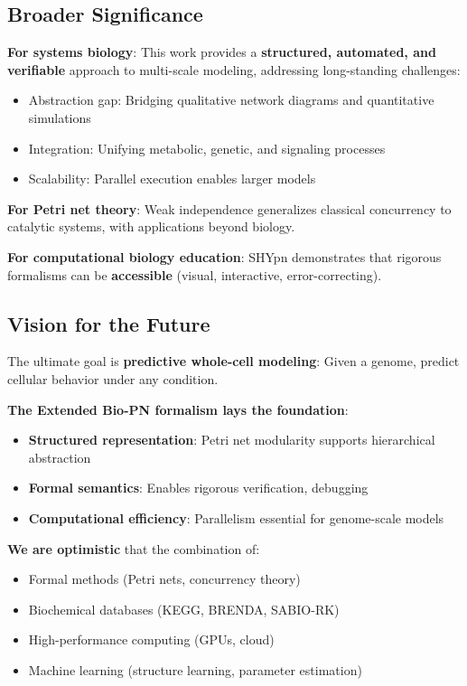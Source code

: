 \subsection{Broader Significance}
\label{subsec:broader-significance}

\textbf{For systems biology}: This work provides a \textbf{structured, automated, and verifiable} approach to multi-scale modeling, addressing long-standing challenges:
\begin{itemize}
    \item Abstraction gap: Bridging qualitative network diagrams and quantitative simulations
    \item Integration: Unifying metabolic, genetic, and signaling processes
    \item Scalability: Parallel execution enables larger models
\end{itemize}

\textbf{For Petri net theory}: Weak independence generalizes classical concurrency to catalytic systems, with applications beyond biology.

\textbf{For computational biology education}: SHYpn demonstrates that rigorous formalisms can be \textbf{accessible} (visual, interactive, error-correcting).

\subsection{Vision for the Future}
\label{subsec:vision}

The ultimate goal is \textbf{predictive whole-cell modeling}: Given a genome, predict cellular behavior under any condition.

\textbf{The Extended Bio-PN formalism lays the foundation}:
\begin{itemize}
    \item \textbf{Structured representation}: Petri net modularity supports hierarchical abstraction
    \item \textbf{Formal semantics}: Enables rigorous verification, debugging
    \item \textbf{Computational efficiency}: Parallelism essential for genome-scale models
\end{itemize}

\textbf{We are optimistic} that the combination of:
\begin{itemize}
    \item Formal methods (Petri nets, concurrency theory)
    \item Biochemical databases (KEGG, BRENDA, SABIO-RK)
    \item High-performance computing (GPUs, cloud)
    \item Machine learning (structure learning, parameter estimation)
\end{itemize}


